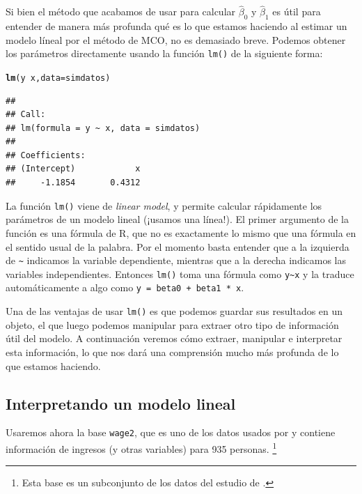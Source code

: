 \documentclass{report}\usepackage[]{graphicx}\usepackage[]{color}
\makeatletter
\newcommand{\hlopt}[1]{\textcolor[rgb]{0,0,0}{#1}}%
\newcommand{\hlstd}[1]{\textcolor[rgb]{0.345,0.345,0.345}{#1}}%
\newcommand{\hlkwc}[1]{\textcolor[rgb]{0.333,0.667,0.333}{#1}}%
\newcommand{\hlkwd}[1]{\textcolor[rgb]{0.737,0.353,0.396}{\textbf{#1}}}%
\newenvironment{kframe}{%
 \def\at@end@of@kframe{}%
 \ifinner\ifhmode%
  \def\at@end@of@kframe{\end{minipage}}%
  \begin{minipage}{\columnwidth}%
 \fi\fi%
 \def\FrameCommand##1{\hskip\@totalleftmargin \hskip-\fboxsep
 \colorbox{shadecolor}{##1}\hskip-\fboxsep
     \hskip-\linewidth \hskip-\@totalleftmargin \hskip\columnwidth}%
 \MakeFramed {\advance\hsize-\width
   \@totalleftmargin\z@ \linewidth\hsize
   \@setminipage}}%
 {\par\unskip\endMakeFramed%
 \at@end@of@kframe}
\newenvironment{knitrout}{}{} %
\newcommand*{\eng}[1]{\textsl{#1}}
\makeatother
\begin{document}
Si bien el método que acabamos de usar para calcular $\hat\beta_0$ y $\hat\beta_1$ es útil para entender de manera más profunda qué es lo que estamos haciendo al estimar un modelo líneal por el método de MCO, no es demasiado breve. Podemos obtener los parámetros directamente usando la función \verb|lm()| de la siguiente forma:

\begin{knitrout}
\color{fgcolor}\begin{kframe}
\begin{alltt}
\hlkwd{lm}\hlstd{(y} \hlopt{~} \hlstd{x,} \hlkwc{data} \hlstd{= simdatos)}
\end{alltt}
\begin{verbatim}
## 
## Call:
## lm(formula = y ~ x, data = simdatos)
## 
## Coefficients:
## (Intercept)            x  
##     -1.1854       0.4312
\end{verbatim}
\end{kframe}
\end{knitrout}

La función \verb|lm()| viene de \eng{linear model}, y permite calcular rápidamente los parámetros de un modelo lineal (¡usamos una línea!). El primer argumento de la función es una fórmula de R, que no es exactamente lo mismo que una fórmula en el sentido usual de la palabra. Por el momento basta entender que a la izquierda de \verb|~| indicamos la variable dependiente, mientras que a la derecha indicamos las variables independientes. Entonces \verb|lm()| toma una fórmula como \verb|y~x| y la traduce automáticamente a algo como \verb|y = beta0 + beta1 * x|.

Una de las ventajas de usar \verb|lm()| es que podemos guardar sus resultados en un objeto, el que luego podemos manipular para extraer otro tipo de información útil del modelo. A continuación veremos cómo extraer, manipular e interpretar esta información, lo que nos dará una comprensión mucho más profunda de lo que estamos haciendo.


\subsection{Interpretando un modelo lineal}

Usaremos ahora la base \verb|wage2|, que es uno de los datos usados por \textcite{wooldridge_introductory_2013} y contiene información de ingresos (y otras variables) para 935 personas. \footnote{Esta base es un subconjunto de los datos del estudio de \textcite{blackburn_unobserved_1992}.}
\end{document}
